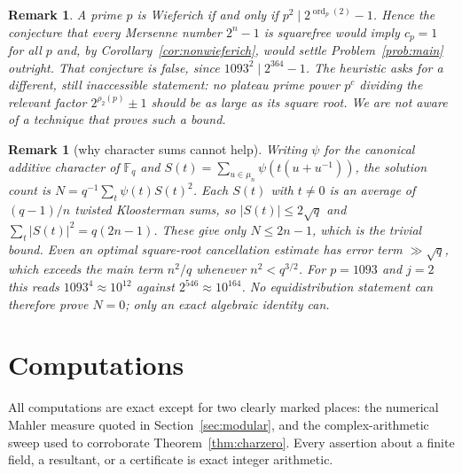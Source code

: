 \documentclass[a4paper]{article}
\newtheorem{remark}[theorem]{Remark}
\newcommand{\F}{\mathbb{F}}
\newcommand{\ord}[2][]{\operatorname{ord}_{#1}\!\left(#2\right)}
\newcommand{\abs}[1]{\left|#1\right|}
\begin{document}
\begin{remark}
	A prime $p$ is Wieferich if and only if
	$p^2\mid2^{\ord[p]{2}}-1$.
	Hence the conjecture that every Mersenne number $2^{n}-1$ is squarefree
	would imply $c_p=1$ for all $p$ and, by
	Corollary~\ref{cor:nonwieferich}, would settle
	Problem~\ref{prob:main} outright.
	That conjecture is false, since $1093^2\mid2^{364}-1$.
	The heuristic asks for a different, still inaccessible statement:
	no plateau prime power $p^c$ dividing the relevant factor
	$2^{\rho_2(p)}\pm1$ should be as large as its square root.
	We are not aware of a technique that proves such a bound.
\end{remark}

\begin{remark}[why character sums cannot help]
	Writing $\psi$ for the canonical additive character of $\F_q$ and
	$S(t)=\sum_{u\in\mu_n}\psi(t(u+u^{-1}))$, the solution count is
	$N=q^{-1}\sum_{t}\psi(t)S(t)^{2}$.
	Each $S(t)$ with $t\ne0$ is an average of $(q-1)/n$ twisted
	Kloosterman sums, so $\abs{S(t)}\leq2\sqrt q$ and
	$\sum_{t}\abs{S(t)}^{2}=q(2n-1)$.
	These give only $N\leq2n-1$, which is the trivial bound.
	Even an optimal square-root cancellation estimate has error term
	$\gg\sqrt q$, which exceeds the main term $n^2/q$ whenever
	$n^{2}<q^{3/2}$.
	For $p=1093$ and $j=2$ this reads $1093^{4}\approx10^{12}$ against
	$2^{546}\approx10^{164}$.
	No equidistribution statement can therefore prove $N=0$; only an exact
	algebraic identity can.
\end{remark}

\section{Computations}\label{sec:computations}

All computations are exact except for two clearly marked places: the
numerical Mahler measure quoted in Section~\ref{sec:modular}, and the
complex-arithmetic sweep used to corroborate Theorem~\ref{thm:charzero}.
Every assertion about a finite field, a resultant, or a certificate is exact
integer arithmetic.
\end{document}
